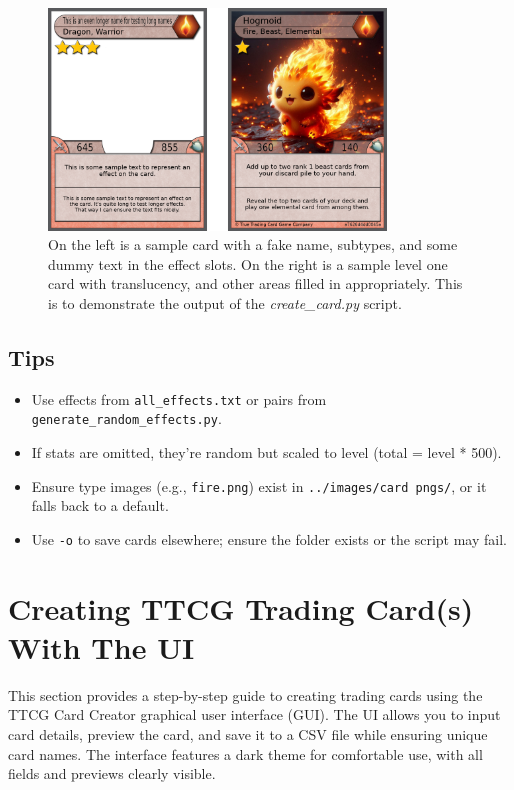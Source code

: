 \begin{figure}[h]
	\centering
	\includegraphics[width=0.8\textwidth]{images/sample_generated_output.png} 
	\caption{On the left is a sample card with a fake name, subtypes, and some dummy text in the effect slots. On the right is a sample level one card with translucency, and other areas filled in appropriately. This is to demonstrate the output of the \textit{create\_card.py} script.}
	\label{fig:sample_generated_output}
\end{figure}

\subsection{Tips}
\begin{itemize}
	\item Use effects from \texttt{all\_effects.txt} or pairs from \texttt{generate\_random\_effects.py}.
	\item If stats are omitted, they’re random but scaled to level (total = level * 500).
	\item Ensure type images (e.g., \texttt{fire.png}) exist in \texttt{../images/card pngs/}, or it falls back to a default.
	\item Use \texttt{-o} to save cards elsewhere; ensure the folder exists or the script may fail.
\end{itemize}










\section{Creating TTCG Trading Card(s) With The UI}

This section provides a step-by-step guide to creating trading cards using the TTCG Card Creator graphical user interface (GUI). The UI allows you to input card details, preview the card, and save it to a CSV file while ensuring unique card names. The interface features a dark theme for comfortable use, with all fields and previews clearly visible.

